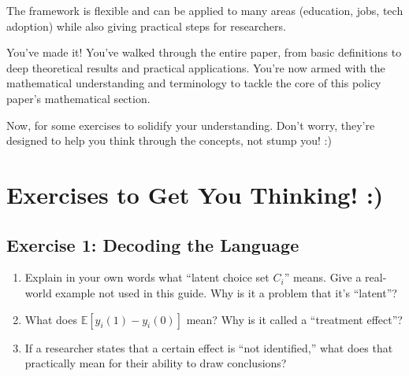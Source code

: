 \documentclass{article}
\newcommand{\E}{\mathbb{E}}
\begin{document}
The framework is flexible and can be applied to many areas (education, jobs, tech adoption) while also giving practical steps for researchers.

\begin{tcolorbox}[mycommentbox,title=ready for action!]
You've made it! You've walked through the entire paper, from basic definitions to deep theoretical results and practical applications. You're now armed with the mathematical understanding and terminology to tackle the core of this policy paper's mathematical section.

Now, for some exercises to solidify your understanding. Don't worry, they're designed to help you think through the concepts, not stump you! :)
\end{tcolorbox}

\section*{Exercises to Get You Thinking! :)} %

\subsection*{Exercise 1: Decoding the Language}
\begin{enumerate}
    \item  Explain in your own words what ``latent choice set $C_i$'' means. Give a real-world example not used in this guide. Why is it a problem that it's ``latent''?
    \item  What does $\E[y_i(1) - y_i(0)]$ mean? Why is it called a ``treatment effect''?
    \item  If a researcher states that a certain effect is ``not identified,'' what does that practically mean for their ability to draw conclusions?
\end{enumerate}
\end{document}

